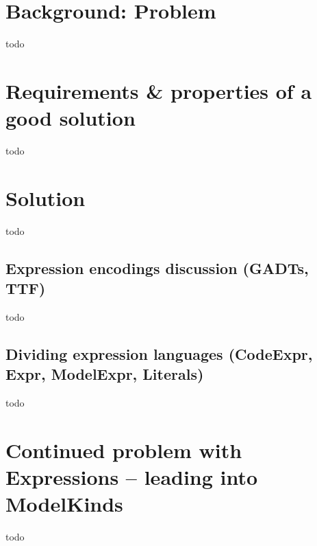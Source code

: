\section{Background: Problem}
todo

\section{Requirements \& properties of a good solution}
todo

\section{Solution}
todo

\subsection{Expression encodings discussion (GADTs, TTF)}
todo

\subsection{Dividing expression languages (CodeExpr, Expr, ModelExpr, Literals)}
todo

\section{Continued problem with Expressions -- leading into ModelKinds}
todo
